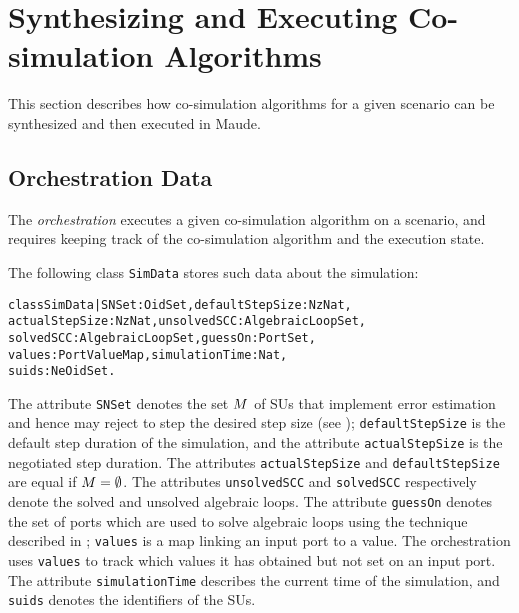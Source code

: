 \section{Synthesizing and Executing Co-simulation
  Algorithms}\label{sc:synthesize} 
This section describes how co-simulation algorithms for a given
scenario can be synthesized and then executed  in Maude. 

\subsection{Orchestration Data}
The \emph{orchestration}  executes a given  co-simulation algorithm on a
scenario, and requires keeping track of the
co-simulation algorithm and the  execution state.

The following class \texttt{SimData} stores such  data about the
simulation: 

\small
\begin{alltt}
class SimData | SNSet : OidSet,           defaultStepSize : NzNat,
          actualStepSize : NzNat,         unsolvedSCC : AlgebraicLoopSet, 
          solvedSCC : AlgebraicLoopSet,   guessOn : PortSet,
          values : PortValueMap,          simulationTime : Nat,
          suids : NeOidSet .
\end{alltt}
\normalsize

\noindent 
The attribute \texttt{SNSet} denotes the set $M$ of SUs that
implement error estimation and hence may reject to step the
desired step size (see
); \texttt{defaultStepSize} is the default
step duration of the simulation,  and the attribute
\texttt{actualStepSize} is the negotiated step duration. 
The attributes \texttt{actualStepSize} and \texttt{defaultStepSize}
are equal if $M = \emptyset$. 
The attributes \texttt{unsolvedSCC} and \texttt{solvedSCC}
respectively denote the solved and unsolved algebraic loops. 
The attribute \texttt{guessOn} denotes the set of ports which are used to
solve algebraic loops using the  technique described in
\cite{thrane2021}; \texttt{values} is a map linking an input port to
a value.  
The orchestration uses \texttt{values} to track which values it has
obtained but not set on an input port.  
The attribute \texttt{simulationTime} describes the current time of
the simulation, and \texttt{suids} denotes the identifiers of the
SUs. 

